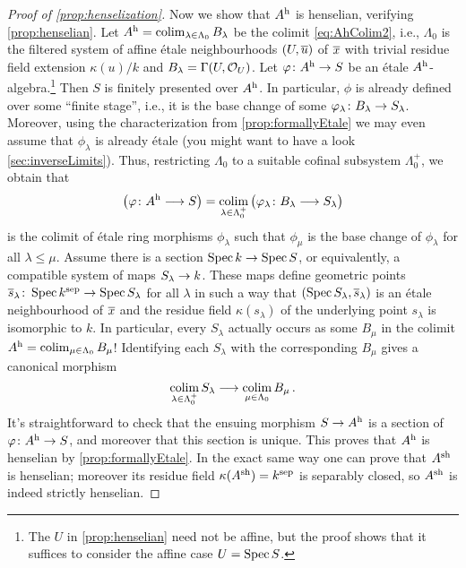 \begin{proof}[Proof of \cref{prop:henselization}]
	Now we show that $A^{\mathrm{h}}$ is henselian, verifying \cref{prop:henselian}. Let $A^{\mathrm{h}}=\operatorname*{colim}_{\lambda\in\Lambda_0}B_\lambda$ be the colimit \cref{eq:AhColim2}, i.e., $\Lambda_0$ is the filtered system of affine étale neighbourhoods $(U,\ov{u})$ of $\ov{x}$ with trivial residue field extension $\kappa(u)/k$ and $B_\lambda=\operatorname{\Gamma}(U,\mathcal{O}_U)$. Let $\phi\colon A^\h\morphism S$ be an étale $A^{\mathrm{h}}$-algebra.\footnote{The $U$ in \cref{prop:henselian} need not be affine, but the proof shows that it suffices to consider the affine case $U=\operatorname{Spec} S$.} Then $S$ is finitely presented over $A^{\mathrm{h}}$. In particular, $\phi$ is already defined over some \enquote{finite stage}, i.e., it is the base change of some $\phi_\lambda\colon B_\lambda\morphism S_\lambda$. Moreover, using the characterization from \cref{prop:formallyEtale} we may even assume that $\phi_\lambda$ is already étale (you might want to have a look \cref{sec:inverseLimits}). Thus, restricting $\Lambda_0$ to a suitable cofinal subsystem $\Lambda_0^+$, we obtain that 
	\begin{equation*}
		\left(\phi\colon A^\h\morphism S\right)=\colimit_{\lambda\in\Lambda_0^+}\big(\phi_\lambda\colon B_\lambda\morphism S_\lambda\big)
	\end{equation*}
	is the colimit of étale ring morphisms $\phi_\lambda$ such that $\phi_\mu$ is the base change of $\phi_\lambda$ for all $\lambda\leq \mu$. Assume there is a section $\Spec k\morphism \Spec S$, or equivalently, a compatible system of maps $S_\lambda\morphism k$. These maps define geometric points $\ov{s}_\lambda\colon \Spec k^\sep \morphism\Spec S_\lambda$ for all $\lambda$ in such a way that $(\Spec S_\lambda,\ov{s}_\lambda)$ is an étale neighbourhood of $\ov{x}$ and the residue field $\kappa(s_\lambda)$ of the underlying point $s_\lambda$ is isomorphic to $k$. In particular, every $S_\lambda$ actually occurs as some $B_\mu$ in the colimit $A^{\mathrm{h}}=\operatorname*{colim}_{\mu\in\Lambda_0}B_\mu$! Identifying each $S_\lambda$ with the corresponding $B_\mu$ gives a canonical morphism
	\begin{equation*}
		\colimit_{\lambda\in\Lambda_0^+}S_\lambda \morphism \colimit_{\mu\in\Lambda_0}B_\mu\,.
	\end{equation*}
	It's straightforward to check that the ensuing morphism $S\morphism A^\h$ is a section of $\phi\colon A^\h\morphism S$, and moreover that this section is unique. This proves that $A^{\mathrm{h}}$ is henselian by \cref{prop:formallyEtale}. In the exact same way one can prove that $A^{\mathrm{sh}}$ is henselian; moreover its residue field $\kappa(A^{\mathrm{sh}})=k^{\mathrm{sep}}$ is separably closed, so $A^{\mathrm{sh}}$ is indeed strictly henselian.
	

\end{proof}
